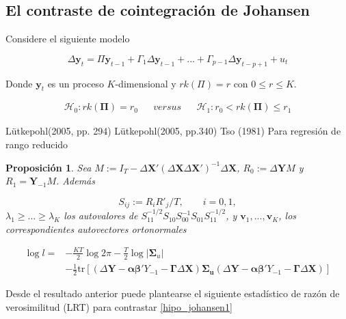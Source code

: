 \documentclass[12pt, twoside]{book}\usepackage[]{graphicx}\usepackage[]{color}
\let\bold\boldsymbol
\let\bf\mathbf
\numberwithin{equation}{section}
\numberwithin{theorem}{section}
\newtheorem{teorema}{Proposición}
\newenvironment{teo}
      {\begin{shaded}\begin{teorema}}
      {\end{teorema}\end{shaded}}
\numberwithin{teorema}{section}
\numberwithin{defi}{section}
\numberwithin{prop}{section}
\numberwithin{defi}{section}
\theoremstyle{plain}
\begin{document}
\subsection{El contraste de cointegración de Johansen}

Considere el siguiente modelo 

\begin{equation}
\Delta \bf{y}_{t} = \Pi \bf{y}_{t-1}+\Gamma_{1}\Delta\bf{y}_{t-1}+...+\Gamma_{p-1}\Delta\bf{y}_{t-p+1}+u_{t}
\end{equation}

Donde $\bf{y}_{t}$ es un proceso $K$-dimensional y $rk(\Pi)=r$ con  $0\leq r\leq K$. 

\begin{align}
\mathcal{H}_{0}: rk(\bold{\Pi})=r_{0} && versus && \mathcal{H}_{1}: r_{0}< rk(\bold{\Pi}) \leq r_{1} \label{hipo_johansen1}
\end{align} 

Lütkepohl(2005, pp. 294)
Lütkepohl(2005, pp.340)
Tso (1981) Para regresión de rango reducido
\begin{teo}
Sea $M:=I_{T}-\Delta \bf{X}'(\Delta \bf{X}\Delta \bf{X}')^{-1}\Delta \bf{X}$, $R_{0}:=\Delta \bf{Y}M$ y $R_{1}=\bf{Y}_{-1}M$. Además 

\begin{equation}
S_{ij}:=R_{i}R'_{j}/T, \qquad i=0,1, 
\end{equation}
$\lambda_{1}\geq ... \geq \lambda_{K}$ los autovalores de $S_{11}^{-1/2}S_{10}S_{00}^{-1}S_{01}S_{11}^{-1/2}$, y $\bf{v}_{1},...,\bf{v}_{K}$, los correspondientes autovectores ortonormales 

\begin{align}
\log l  =  & -\frac{KT}{2}\log 2\pi-\frac{T}{2}\log |\bold{\Sigma}_{u}|  \nonumber \\ 
  & -\frac{1}{2}\text{tr}\left[(\Delta \bf{Y}-\boldsymbol{\alpha}\boldsymbol{\beta}'Y_{-1}-\bold{\Gamma}\Delta\bf{X})\bold{\Sigma_{u}}(\Delta \bf{Y}-\boldsymbol{\alpha}\boldsymbol{\beta}'Y_{-1}-\bold{\Gamma}\Delta\bf{X})\right] 
\end{align}
\end{teo}

Desde el resultado anterior puede plantearse el siguiente estadístico de razón de verosimilitud (LRT) para contrastar \eqref{hipo_johansen1}
\end{document}
